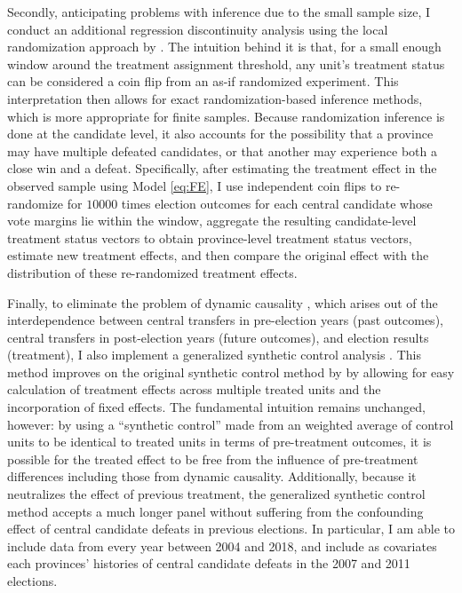 \documentclass[12pt]{article}
\newcommand{\1}{\mathbbm{1}}
\begin{document}
Secondly, anticipating problems with inference due to the small sample size, I conduct an additional regression discontinuity analysis using the local randomization approach by \citet{CattaneoTitiunik2015}. The intuition behind it is that, for a small enough window around the treatment assignment threshold, any unit's treatment status can be considered a coin flip from an as-if randomized experiment. This interpretation then allows for exact randomization-based inference methods, which is more appropriate for finite samples. Because randomization inference is done at the candidate level, it also accounts for the possibility that a province may have multiple defeated candidates, or that another may experience both a close win and a defeat. Specifically, after estimating the treatment effect in the observed sample using Model \ref{eq:FE}, I use independent coin flips to re-randomize for $10000$ times election outcomes for each central candidate whose vote margins lie within the window, aggregate the resulting candidate-level treatment status vectors to obtain province-level treatment status vectors, estimate new treatment effects, and then compare the original effect with the distribution of these re-randomized treatment effects.

Finally, to eliminate the problem of dynamic causality \citep{ImaiKim2012}, which arises out of the interdependence between central transfers in pre-election years (past outcomes), central transfers in post-election years (future outcomes), and election results (treatment), I also implement a generalized synthetic control analysis \citep{Xu2017gsynth}. This method improves on the original synthetic control method by \citet{Abadie2010, Abadie2015} by allowing for easy calculation of treatment effects across multiple treated units and the incorporation of fixed effects. The fundamental intuition remains unchanged, however: by using a ``synthetic control'' made from an weighted average of control units to be identical to treated units in terms of pre-treatment outcomes, it is possible for the treated effect to be free from the influence of pre-treatment differences including those from dynamic causality. Additionally, because it neutralizes the effect of previous treatment, the generalized synthetic control method accepts a much longer panel without suffering from the confounding effect of central candidate defeats in previous elections. In particular, I am able to include data from every year between 2004 and 2018, and include as covariates each provinces' histories of central candidate defeats in the 2007 and 2011 elections.
\end{document}
